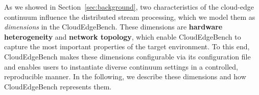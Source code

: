 \documentclass[runningheads]{llncs}
\begin{document}
As we showed in Section~\ref{sec:background}, two characteristics of the cloud-edge continuum influence the distributed stream processing, which we model them as \textit{dimensions} in the CloudEdgeBench.
These dimensions are \textbf{hardware heterogeneity} and \textbf{network topology}, which enable CloudEdgeBench to capture the most important properties of the target environment. %
To this end, CloudEdgeBench makes these dimensions configurable via its configuration file and enables users to instantiate diverse continuum settings in a controlled, reproducible manner.
In the following, we describe these dimensions and how CloudEdgeBench represents them.
\end{document}
